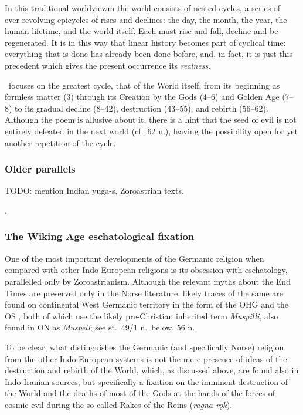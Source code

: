 In this traditional worldviewm the world consists of nested cycles, a series of ever-revolving epicycles of rises and declines: the day, the month, the year, the human lifetime, and the world itself.  Each must rise and fall, decline and be regenerated.  It is in this way that linear history becomes part of cyclical time: everything that is done has already been done before, and, in fact, it is just this precedent which gives the present occurrence its \emph{realness}.

\Voluspa\ focuses on the greatest cycle, that of the World itself, from its beginning as formless matter (3) through its Creation by the Gods (4--6) and Golden Age (7--8) to its gradual decline (8--42), destruction (43--55), and rebirth (56--62).  Although the poem is allusive about it, there is a hint that the seed of evil is not entirely defeated in the next world (cf.~62 n.), leaving the possibility open for yet another repetition of the cycle.


\subsubsection{Older parallels}

TODO: mention Indian yuga-s, Zoroastrian texts.

\textcite{Hultgård2022}.

\subsubsection{The Wiking Age eschatological fixation}

One of the most important developments of the Germanic religion when compared with other Indo-European religions is its obsession with eschatology, parallelled only by Zoroastrianism.  Although the relevant myths about the End Times are preserved only in the Norse literature, likely traces of the same are found on continental West Germanic territory in the form of the OHG  and the OS , both of which use the likely pre-Christian inherited term \emph{Muspilli}, also found in ON as \emph{Muspell}; see st.~49/1 n.~below,  56 n.

To be clear, what distinguishes the Germanic (and specifically Norse) religion from the other Indo-European systems is not the mere presence of ideas of the destruction and rebirth of the World, which, as discussed above, are found also in Indo-Iranian sources, but specifically a fixation on the imminent destruction of the World and the deaths of most of the Gods at the hands of the forces of cosmic evil during the so-called Rakes of the Reins (\emph{ragna rǫk}).

